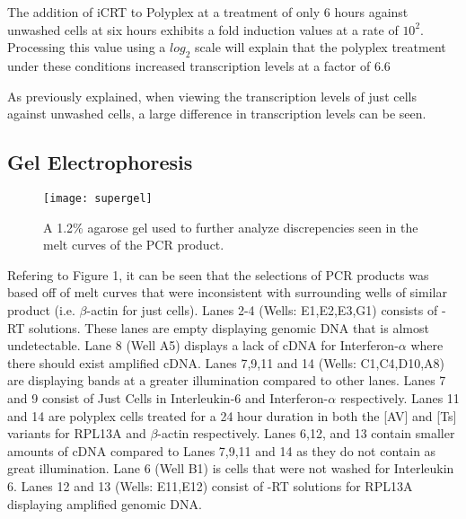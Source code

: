 \documentclass[journal, a4paper]{IEEEtran}
\begin{document}
    The addition of iCRT to Polyplex at a treatment of only 6 hours against unwashed
    cells at six hours exhibits a fold induction values at a rate of $10^2$. Processing
    this value using a $log_2$ scale will explain that the polyplex treatment under these
    conditions increased transcription levels at a factor of 6.6

    As previously explained, when viewing the transcription levels of just cells
    against unwashed cells, a large difference in transcription levels can be seen.

  \subsection{Gel Electrophoresis}

    \begin{figure}[t]
      \centering
      \texttt{[image: supergel]}
      \caption{A 1.2\% agarose gel used to further analyze discrepencies seen in the melt curves of the PCR product.}
      \label{fig:mesh1}
    \end{figure}

    Refering to Figure 1, it can be seen that the selections of PCR products was based off of melt curves that were inconsistent with
    surrounding wells of similar product (i.e. $\beta$-actin for just cells).
    Lanes 2-4 (Wells: E1,E2,E3,G1) consists of -RT solutions. These lanes are empty displaying
    genomic DNA that is almost undetectable. Lane 8 (Well A5) displays a lack of cDNA
    for Interferon-$\alpha$ where there should exist amplified cDNA. Lanes  7,9,11 and 14
    (Wells: C1,C4,D10,A8) are displaying bands at a greater illumination compared to other lanes.
    Lanes 7 and 9 consist of Just Cells in Interleukin-6 and Interferon-$\alpha$ respectively.
    Lanes 11 and 14 are polyplex cells treated for a 24 hour duration in both the [AV] and [Ts] variants
    for RPL13A and $\beta$-actin respectively.
    Lanes 6,12, and 13 contain smaller amounts of cDNA compared to Lanes 7,9,11 and 14 as they do not contain
    as great illumination.
    Lane 6 (Well B1) is cells that were not washed for Interleukin 6.
    Lanes 12 and 13 (Wells: E11,E12) consist of -RT solutions for RPL13A displaying amplified genomic DNA.
\end{document}

